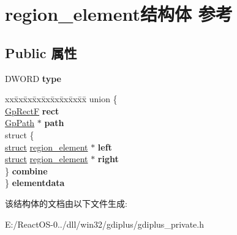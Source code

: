 \hypertarget{structregion__element}{}\section{region\+\_\+element结构体 参考}
\label{structregion__element}
\subsection*{Public 属性}
\begin{DoxyCompactItemize}
\item 
\mbox{\label{structregion__element_a5b8ebb7a5ef757b1cf695ee4bbb6f9a8}} 
D\+W\+O\+RD {\bfseries type}
\item 
\mbox{\label{structregion__element_ae2ddd136b535fede90de5d37bc15438c}} 
\begin{tabbing}
xx\=xx\=xx\=xx\=xx\=xx\=xx\=xx\=xx\=\kill
union \{\\
\>\hyperlink{struct_rect_f}{GpRectF} {\bfseries rect}\\
\>\hyperlink{struct_gp_path}{GpPath} $\ast$ {\bfseries path}\\
\>struct \{\\
\>\>\hyperlink{interfacestruct}{struct} \hyperlink{structregion__element}{region\_element} $\ast$ {\bfseries left}\\
\>\>\hyperlink{interfacestruct}{struct} \hyperlink{structregion__element}{region\_element} $\ast$ {\bfseries right}\\
\>\} {\bfseries combine}\\
\} {\bfseries elementdata}\\

\end{tabbing}\end{DoxyCompactItemize}


该结构体的文档由以下文件生成\+:\begin{DoxyCompactItemize}
\item 
E\+:/\+React\+O\+S-\/0../dll/win32/gdiplus/gdiplus\+\_\+private.\+h\end{DoxyCompactItemize}
